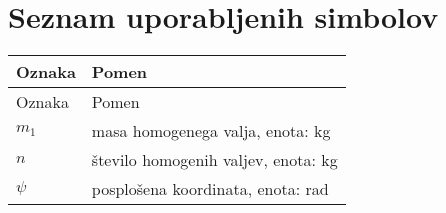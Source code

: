 \section*{Seznam uporabljenih simbolov}
%
\begin{longtable}[l]{lp{}} %
\hline
Oznaka & Pomen \\
\hline
\endfirsthead
\hline
Oznaka & Pomen \\
\hline
\endhead
\hline
\endfoot
\hline
\endlastfoot
$m_1$ & masa homogenega valja, enota: kg\\
$n$ & število homogenih valjev, enota: kg\\
\hline
$\psi$ & posplošena koordinata, enota: rad\\
\end{longtable}  